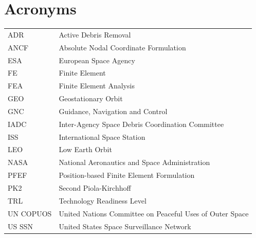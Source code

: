 \section*{Acronyms}
\begin{tabular}{lp{}}
    ADR         & Active Debris Removal \\
    ANCF        & Absolute Nodal Coordinate Formulation \\
    ESA         & European Space Agency \\
    FE          & Finite Element \\
    FEA         & Finite Element Analysis \\
    GEO         & Geostationary Orbit \\
    GNC         & Guidance, Navigation and Control \\
    IADC        & Inter-Agency Space Debris Coordination Committee \\
    ISS         & International Space Station \\
    LEO         & Low Earth Orbit \\
    NASA        & National Aeronautics and Space Administration \\
    PFEF        & Position-based Finite Element Formulation \\
    PK2         & Second Piola-Kirchhoff \\
    TRL         & Technology Readiness Level \\
    UN COPUOS   & United Nations Committee on Peaceful Uses of Outer Space\\
    US SSN      & United States Space Surveillance Network \\
\end{tabular}